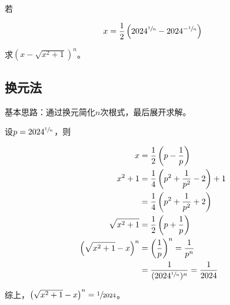 

若

\[ x = \frac12\left(2024^{\sfrac1n} - 2024^{-\sfrac1n}\right) \]

求$\left(x - \sqrt{x^2 + 1}\right)^n$。


\subsection{换元法}

基本思路：通过换元简化$n$次根式，最后展开求解。

设$p = 2024^{\sfrac1n}$，则

\begin{align*}
  x &= \frac12\left(p - \frac1p\right) \\
  x^2 + 1 &= \frac14\left(p^2 + \frac1{p^2} - 2\right) + 1 \\
  &= \frac14\left(p^2 + \frac1{p^2} + 2\right) \\
  \sqrt{x^2 + 1} &= \frac12\left(p + \frac1p\right) \\
  \left(\sqrt{x^2 + 1} - x\right)^n &= \left(\frac1p\right)^n = \frac1{p^n} \\
  &= \frac1{(2024^{\sfrac1n})^n} = \frac1{2024} \\
\end{align*}

综上，$\left(\sqrt{x^2 + 1} - x\right)^n = \sfrac1{2024}$。
